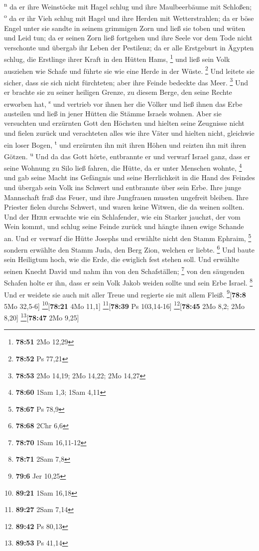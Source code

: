 \textsuperscript{n}  da er ihre Weinstöcke mit Hagel
schlug und ihre Maulbeerbäume mit Schloßen; \textsuperscript{o}
 da er ihr Vieh schlug mit Hagel und ihre Herden mit
Wetterstrahlen;  da er böse Engel unter sie sandte in
seinem grimmigen Zorn und ließ sie toben und wüten und Leid tun;
 da er seinen Zorn ließ fortgehen und ihre Seele vor dem
Tode nicht verschonte und übergab ihr Leben der Pestilenz;
 da er alle Erstgeburt in Ägypten schlug, die Erstlinge
ihrer Kraft in den Hütten Hams, \footnote{\textbf{78:51} 2Mo 12,29}
 und ließ sein Volk ausziehen wie Schafe und führte sie
wie eine Herde in der Wüste. \footnote{\textbf{78:52} Ps 77,21}
 Und leitete sie sicher, dass sie sich nicht fürchteten;
aber ihre Feinde bedeckte das Meer. \footnote{\textbf{78:53} 2Mo 14,19;
  2Mo 14,22; 2Mo 14,27}  Und er brachte sie zu seiner
heiligen Grenze, zu diesem Berge, den seine Rechte erworben hat,
\textsuperscript{s}  und vertrieb vor ihnen her die
Völker und ließ ihnen das Erbe austeilen und ließ in jener Hütten die
Stämme Israels wohnen.  Aber sie versuchten und erzürnten
Gott den Höchsten und hielten seine Zeugnisse nicht  und
fielen zurück und verachteten alles wie ihre Väter und hielten nicht,
gleichwie ein loser Bogen, \textsuperscript{t}  und
erzürnten ihn mit ihren Höhen und reizten ihn mit ihren Götzen.
\textsuperscript{u}  Und da das Gott hörte, entbrannte er
und verwarf Israel ganz,  dass er seine Wohnung zu Silo
ließ fahren, die Hütte, da er unter Menschen wohnte, \footnote{\textbf{78:60}
  1Sam 1,3; 1Sam 4,11}  und gab seine Macht ins Gefängnis
und seine Herrlichkeit in die Hand des Feindes  und
übergab sein Volk ins Schwert und entbrannte über sein Erbe.
 Ihre junge Mannschaft fraß das Feuer, und ihre
Jungfrauen mussten ungefreit bleiben.  Ihre Priester
fielen durchs Schwert, und waren keine Witwen, die da weinen sollten.
 Und der \textsc{Herr} erwachte wie ein Schlafender, wie
ein Starker jauchzt, der vom Wein kommt,  und schlug
seine Feinde zurück und hängte ihnen ewige Schande an. 
Und er verwarf die Hütte Josephs und erwählte nicht den Stamm Ephraim,
\footnote{\textbf{78:67} Ps 78,9}  sondern erwählte den
Stamm Juda, den Berg Zion, welchen er liebte. \footnote{\textbf{78:68}
  2Chr 6,6}  Und baute sein Heiligtum hoch, wie die Erde,
die ewiglich fest stehen soll.  Und erwählte seinen
Knecht David und nahm ihn von den Schafställen; \footnote{\textbf{78:70}
  1Sam 16,11-12}  von den säugenden Schafen holte er ihn,
dass er sein Volk Jakob weiden sollte und sein Erbe Israel. \footnote{\textbf{78:71}
  2Sam 7,8}  Und er weidete sie auch mit aller Treue und
regierte sie mit allem Fleiß. \footnote{\textbf{79:6} Jer 10,25}{[}\textbf{78:8}
5Mo 32,5-6{]} \footnote{\textbf{89:21} 1Sam 16,18}{[}\textbf{78:21} 4Mo
11,1{]} \footnote{\textbf{89:27} 2Sam 7,14}{[}\textbf{78:39} Ps
103,14-16{]} \footnote{\textbf{89:42} Ps 80,13}{[}\textbf{78:45} 2Mo
8,2; 2Mo 8,20{]} \footnote{\textbf{89:53} Ps 41,14}{[}\textbf{78:47} 2Mo
9,25{]}

